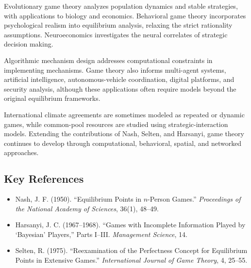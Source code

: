 Evolutionary game theory analyzes population dynamics and stable strategies,
with applications to biology and economics. Behavioral game theory incorporates
psychological realism into equilibrium analysis, relaxing the strict rationality
assumptions. Neuroeconomics investigates the neural correlates of strategic
decision making.

Algorithmic mechanism design addresses computational constraints in implementing
mechanisms. Game theory also informs multi-agent systems, artificial
intelligence, autonomous-vehicle coordination, digital platforms, and security
analysis, although these applications often require models beyond the original
equilibrium frameworks.

International climate agreements are sometimes modeled as repeated or dynamic
games, while common-pool resources are studied using strategic-interaction
models. Extending the contributions of Nash, Selten, and Harsanyi, game theory
continues to develop through computational, behavioral, spatial, and networked
approaches.

\subsection*{Key References}
\begin{itemize}
    \item Nash, J. F. (1950). ``Equilibrium Points in $n$-Person Games.'' \textit{Proceedings of the National Academy of Sciences}, 36(1), 48--49.
    \item Harsanyi, J. C. (1967--1968). ``Games with Incomplete Information Played by `Bayesian' Players,'' Parts I--III. \textit{Management Science}, 14.
    \item Selten, R. (1975). ``Reexamination of the Perfectness Concept for Equilibrium Points in Extensive Games.'' \textit{International Journal of Game Theory}, 4, 25--55.
\end{itemize}
